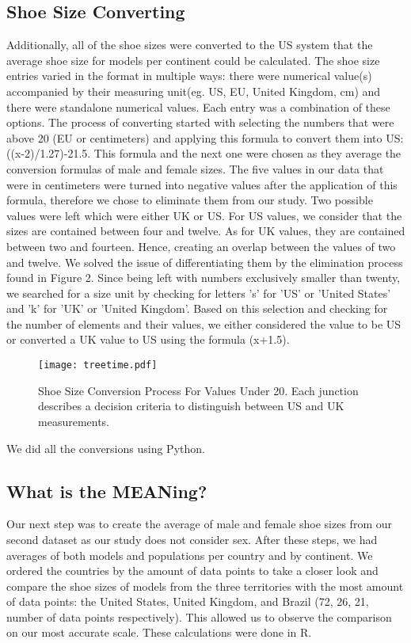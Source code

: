 \documentclass{article}
\begin{document}
\subsection{Shoe Size Converting}
Additionally, all of the shoe sizes were converted to the US system  that the average shoe size for models per continent could be calculated. The shoe size entries varied in the format in multiple ways: there were numerical value(s) accompanied by their measuring unit(eg. US, EU, United Kingdom, cm) and there were standalone numerical values. Each entry was a combination of these options. 
The process of converting started with selecting the numbers that were above 20 (EU or centimeters) and applying this formula to convert them into US: 
((x-2)/1.27)-21.5.
This formula and the next one were chosen as they average the conversion formulas of male and female sizes. 
The five values in our data that were in centimeters were turned into negative values after the application of this formula, therefore we chose to eliminate them from our study. 
Two possible values were left which were either UK or US. For US values, we consider that the sizes are contained between four and twelve. As for UK values, they are contained between two and fourteen. Hence, creating an overlap between the values of two and twelve. We solved the issue of differentiating them by the elimination process found in Figure 2. Since being left with numbers exclusively smaller than twenty, we searched for a size unit by checking for letters 's' for 'US' or 'United States' and 'k' for 'UK' or 'United Kingdom'. Based on this selection and checking for the number of elements and their values, we either considered the value to be US or converted a UK value to US using the formula (x+1.5). 
\begin{figure}
 \centering
 \texttt{[image: treetime.pdf]}
 \caption{Shoe Size Conversion Process For Values Under 20. Each junction describes a decision criteria to distinguish between US and UK measurements.}
\end{figure}
We did all the conversions using Python. 

\subsection{What is the MEANing?}
Our next step was to create the average of male and female shoe sizes from our second dataset as our study does not consider sex. After these steps, we had averages of both models and populations per country and by continent. 
We ordered the countries by the amount of data points to take a closer look and compare the shoe sizes of models from the three territories with the most amount of data points: the United States, United Kingdom, and Brazil (72, 26, 21, number of data points respectively). This allowed us to observe the comparison on our most accurate scale. These calculations were done in R.
\end{document}
